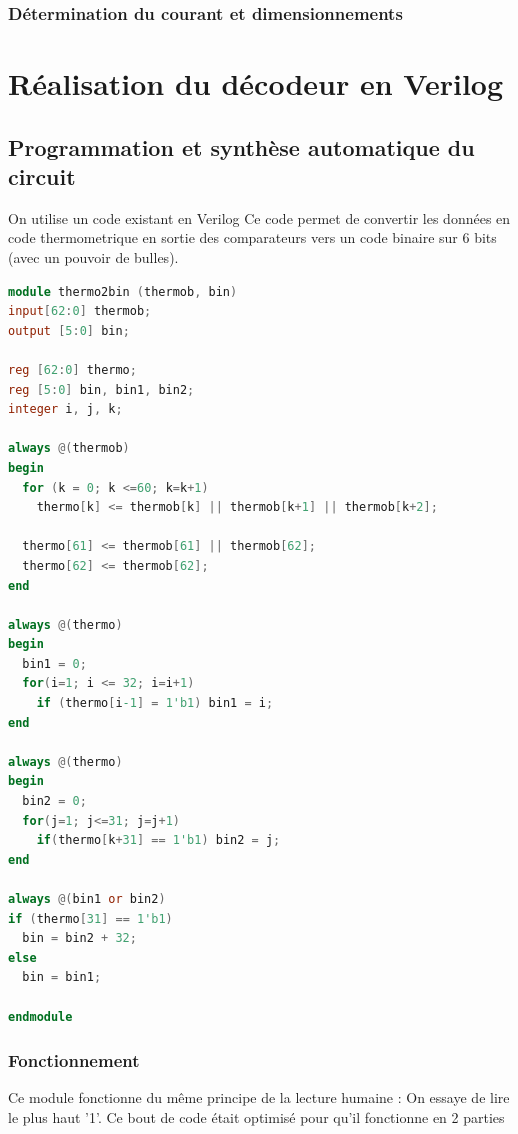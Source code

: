 \documentclass[11pt]{article}
\begin{document}
\subsubsection{D\'etermination du courant et dimensionnements}
\fi

\clearpage

\section{R\'ealisation du d\'ecodeur en Verilog}
\subsection{Programmation et synth\`ese automatique du circuit}
On utilise un code existant en Verilog\cite{Thermometer}
Ce code permet de convertir les donn\'ees en code thermometrique en sortie des
comparateurs vers un code binaire sur 6 bits (avec un pouvoir de bulles).

\begin{lstlisting}[language=Verilog, belowskip=-0.5 \baselineskip]
module thermo2bin (thermob, bin)
input[62:0] thermob;
output [5:0] bin;

reg [62:0] thermo;
reg [5:0] bin, bin1, bin2;
integer i, j, k;

always @(thermob)
begin
  for (k = 0; k <=60; k=k+1)
    thermo[k] <= thermob[k] || thermob[k+1] || thermob[k+2];

  thermo[61] <= thermob[61] || thermob[62];
  thermo[62] <= thermob[62];
end

always @(thermo)
begin
  bin1 = 0;
  for(i=1; i <= 32; i=i+1)
    if (thermo[i-1] = 1'b1) bin1 = i;
end

always @(thermo)
begin
  bin2 = 0;
  for(j=1; j<=31; j=j+1)
    if(thermo[k+31] == 1'b1) bin2 = j;
end

always @(bin1 or bin2)
if (thermo[31] == 1'b1)
  bin = bin2 + 32;
else
  bin = bin1;

endmodule

\end{lstlisting}

\subsubsection{Fonctionnement}

Ce module fonctionne du m\^eme principe de la lecture humaine : On essaye de lire le plus
haut '1'. Ce bout de code \'etait optimis\'e pour qu'il fonctionne en 2 parties
\end{document}
